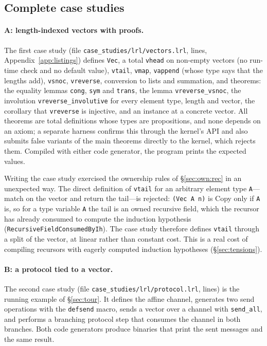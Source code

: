 \subsection{Complete case studies}\label{sec:eval:cases}

\paragraph{A: length-indexed vectors with proofs.}
The first case study (file \texttt{case\_studies/\allowbreak lrl/\allowbreak vectors.lrl}, \NumVectorsLines{} lines, Appendix~\ref{app:listings}) defines \lstinline|Vec|, a total \lstinline|vhead| on non-empty vectors (no run-time check and no default value), \lstinline|vtail|, \lstinline|vmap|, \lstinline|vappend| (whose type says that the lengths add), \lstinline|vsnoc|, \lstinline|vreverse|, conversion to lists and summation, and \NumVectorsTheorems{} theorems: the equality lemmas \lstinline|cong|, \lstinline|sym| and \lstinline|trans|, the lemma \lstinline|vreverse_vsnoc|, the involution \lstinline|vreverse_involutive| for every element type, length and vector, the corollary that \lstinline|vreverse| is injective, and an instance at a concrete vector.
All theorems are total definitions whose types are propositions, and none depends on an axiom; a separate harness confirms this through the kernel's API and also submits false variants of the main theorems directly to the kernel, which rejects them.
Compiled with either code generator, the program prints the expected values.

Writing the case study exercised the ownership rules of \S\ref{sec:own:rec} in an unexpected way.
The direct definition of \lstinline|vtail| for an arbitrary element type \lstinline|A|---match on the vector and return the tail---is rejected: \lstinline|(Vec A n)| is Copy only if \lstinline|A| is, so for a type variable \lstinline|A| the tail is an owned recursive field, which the recursor has already consumed to compute the induction hypothesis (\lstinline|RecursiveFieldConsumedByIh|).
The case study therefore defines \lstinline|vtail| through a split of the vector, at linear rather than constant cost.
This is a real cost of compiling recursors with eagerly computed induction hypotheses (\S\ref{sec:tensions}).

\paragraph{B: a protocol tied to a vector.}
The second case study (file \texttt{case\_studies/\allowbreak lrl/\allowbreak protocol.lrl}, \NumProtocolLines{} lines) is the running example of \S\ref{sec:tour}.
It defines the affine channel, generates two send operations with the \lstinline|defsend| macro, sends a vector over a channel with \lstinline|send_all|, and performs a branching protocol step that consumes the channel in both branches.
Both code generators produce binaries that print the sent messages and the same result.

